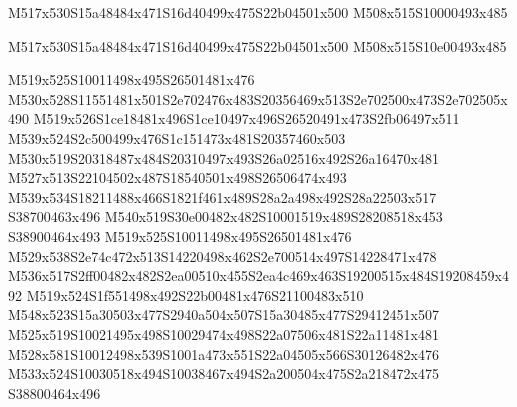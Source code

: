 \documentclass{article}
\begin{document}
\begin{multicols}{2}


\begin{center}
M517x530S15a48484x471S16d40499x475S22b04501x500 M508x515S10000493x485 
\end{center}








\begin{center}
M517x530S15a48484x471S16d40499x475S22b04501x500 M508x515S10e00493x485 
\end{center}


M519x525S10011498x495S26501481x476 M530x528S11551481x501S2e702476x483S20356469x513S2e702500x473S2e702505x490 M519x526S1ce18481x496S1ce10497x496S26520491x473S2fb06497x511 M539x524S2c500499x476S1c151473x481S20357460x503 M530x519S20318487x484S20310497x493S26a02516x492S26a16470x481 M527x513S22104502x487S18540501x498S26506474x493 M539x534S18211488x466S1821f461x489S28a2a498x492S28a22503x517 S38700463x496 M540x519S30e00482x482S10001519x489S28208518x453 S38900464x493 M519x525S10011498x495S26501481x476 M529x538S2e74c472x513S14220498x462S2e700514x497S14228471x478 M536x517S2ff00482x482S2ea00510x455S2ea4c469x463S19200515x484S19208459x492 M519x524S1f551498x492S22b00481x476S21100483x510 M548x523S15a30503x477S2940a504x507S15a30485x477S29412451x507 M525x519S10021495x498S10029474x498S22a07506x481S22a11481x481 M528x581S10012498x539S1001a473x551S22a04505x566S30126482x476 M533x524S10030518x494S10038467x494S2a200504x475S2a218472x475 S38800464x496


\end{multicols}
\end{document}
